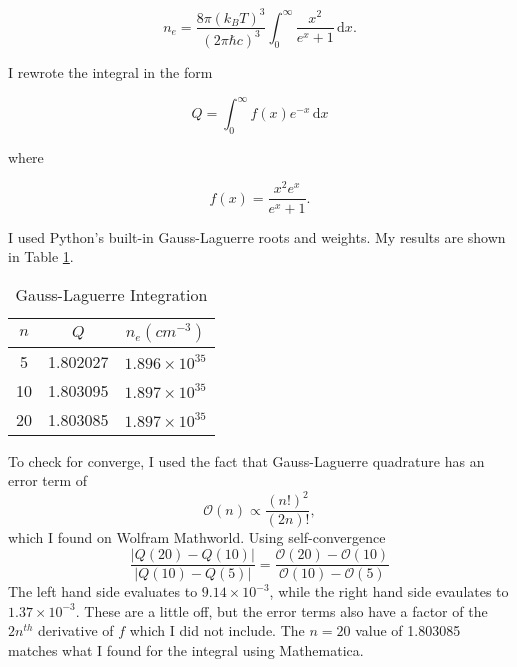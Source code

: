 \documentclass[11pt,letterpaper]{article}
\begin{document}
\begin{equation}
n_e=\frac{8\pi(k_BT)^3}{(2\pi\hbar c)^3}\int_0^{\infty}\!\frac{x^2}{e^{x}+1}\,\mathrm{d}x.
\end{equation}

I rewrote the integral in the form 

\begin{equation}
Q=\int_0^{\infty}\!f(x)e^{-x}\,\mathrm{d}x
\end{equation}

where

\begin{equation}
f(x)=\frac{x^2e^{x}}{e^{x}+1}.
\end{equation}

I used Python's built-in Gauss-Laguerre roots and weights.  My results 
are shown in Table \ref{tab:two}.

\begin{table}[!h]
\centering
\caption{Gauss-Laguerre Integration}
\begin{tabular}{c|c|c}
\hline
$n$ & $Q$ & $n_e (cm^{-3})$\\
\hline
5 & 1.802027 & $1.896\times10^{35}$\\
10 & 1.803095 & $1.897\times10^{35}$\\
20 & 1.803085 & $1.897\times10^{35}$\\
\hline
\end{tabular}
\label{tab:two}
\end{table}

To check for converge, I used the fact that Gauss-Laguerre quadrature 
has an error term of 
\begin{equation}
\mathcal{O}(n)\propto\frac{(n!)^2}{(2n)!},
\end{equation}
which I found on Wolfram Mathworld.  Using self-convergence
\begin{equation}
\frac{|Q(20)-Q(10)|}{|Q(10)-Q(5)|}=\frac{\mathcal{O}(20)-\mathcal{O}(10)}{\mathcal{O}(10)-\mathcal{O}(5)}
\end{equation}
The left hand side evaluates to $9.14\times 10^{-3}$, while the right hand side evaulates to $1.37\times 10^{-3}$.
These are a little off, but the error terms also have a factor of the $2n^{th}$ derivative of $f$ which I did 
not include.  The $n=20$ value of 1.803085 matches what I found for the integral using Mathematica.
\end{document}
